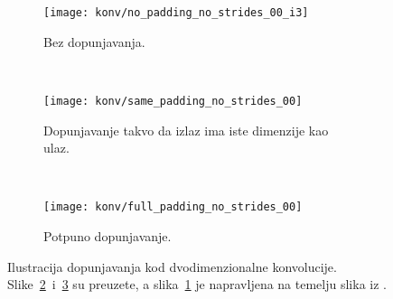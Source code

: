 \documentclass[utf8, diplomski, lmodern]{fer}
\begin{document}
\begin{figure}
	\centering
	\begin{subfigure}[t]{0.31\textwidth}
		\texttt{[image: konv/no\_padding\_no\_strides\_00\_i3]}
		\caption{Bez dopunjavanja.}
		\label{subfig:konv-nopad}
	\end{subfigure}
	~
	\begin{subfigure}[t]{0.31\textwidth}
		\centering
		\texttt{[image: konv/same\_padding\_no\_strides\_00]}
		\caption{Dopunjavanje takvo da izlaz ima iste dimenzije kao ulaz.}
		\label{subfig:konv-samepad}
	\end{subfigure}
	~
	\begin{subfigure}[t]{0.31\textwidth}
		\centering
		\texttt{[image: konv/full\_padding\_no\_strides\_00]}
		\caption{Potpuno dopunjavanje.}
		\label{subfig:konv-fullpad}
	\end{subfigure}
	\caption{Ilustracija dopunjavanja kod dvodimenzionalne konvolucije. Slike~\ref{subfig:konv-samepad}~i~\ref{subfig:konv-fullpad} su preuzete, a slika~\ref{subfig:konv-nopad} je napravljena na temelju slika iz \citet{Dumoulin:2016:GCADL}.}
	\label{fig:konvolucija-dopunjavanje}
\end{figure}
\end{document}
